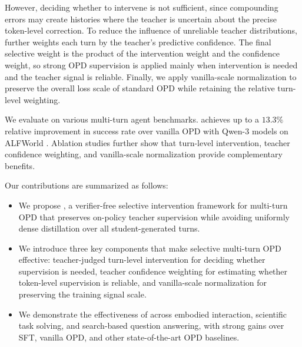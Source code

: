 However, deciding whether to intervene is not sufficient, since compounding errors may create histories where the teacher is uncertain about the precise token-level correction.
%
To reduce the influence of unreliable teacher distributions, \ours{} further weights each turn by the teacher's predictive confidence.
%
The final selective weight is the product of the intervention weight and the confidence weight, so strong OPD supervision is applied mainly when intervention is needed and the teacher signal is reliable.
%
Finally, we apply vanilla-scale normalization to preserve the overall loss scale of standard OPD while retaining the relative turn-level weighting.

We evaluate \ours{} on various multi-turn agent benchmarks.
%
\ours{} achieves up to a $13.3\%$ relative improvement in success rate over vanilla OPD with Qwen-3 models \citep{yang2025qwen3} on ALFWorld \citep{shridhar2020alfworld}.
%
Ablation studies further show that turn-level intervention, teacher confidence weighting, and vanilla-scale normalization provide complementary benefits.

Our contributions are summarized as follows:
%
\begin{itemize}
    \item We propose \ours{}, a verifier-free selective intervention framework for multi-turn OPD that preserves on-policy teacher supervision while avoiding uniformly dense distillation over all student-generated turns.
    \item We introduce three key components that make selective multi-turn OPD effective: teacher-judged turn-level intervention for deciding whether supervision is needed, teacher confidence weighting for estimating whether token-level supervision is reliable, and vanilla-scale normalization for preserving the training signal scale.
    \item We demonstrate the effectiveness of \ours{} across embodied interaction, scientific task solving, and search-based question answering, with strong gains over SFT, vanilla OPD, and other state-of-the-art OPD baselines.
\end{itemize}